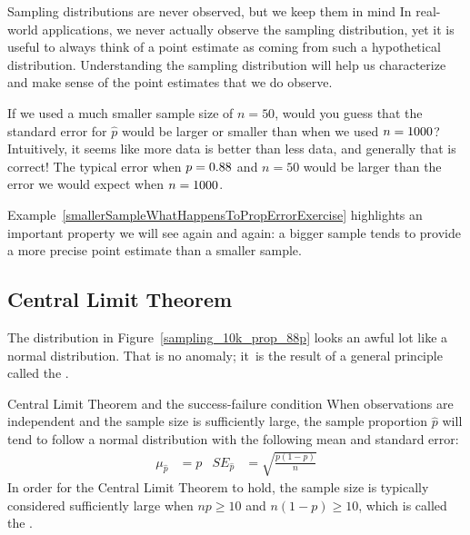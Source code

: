 \begin{onebox}{Sampling distributions are
    never observed, but we keep them in mind}
  In real-world applications, we never actually observe the
  sampling distribution, yet it is useful to always think of
  a point estimate as coming from such a hypothetical
  distribution.
  \mbox{Understanding} the sampling distribution will help us
  characterize and make sense of the point estimates that we
  do observe.
\end{onebox}

\begin{examplewrap}
\begin{nexample}{If we used a much smaller sample size of $n = 50$,
would you guess that the standard error for $\hat{p}$ would be larger
or smaller than when we used $n = 1000{}$?}
\label{smallerSampleWhatHappensToPropErrorExercise}
Intuitively, it seems like more data is better
than less data, and generally that is correct! The typical error
when $p = 0.88{}$ and $n = 50$ would be larger
than the error we would expect when $n = 1000{}$.
\end{nexample}
\end{examplewrap}

Example~\ref{smallerSampleWhatHappensToPropErrorExercise}
highlights an important property we will see again and again:
a bigger sample tends to provide a more precise point estimate
than a smaller sample.



\subsection{Central Limit Theorem}

The distribution in
Figure~\ref{sampling_10k_prop_88p} looks an awful lot like
a normal distribution. That is no anomaly; it~is the result
of a general principle called the
.

\begin{onebox}{Central Limit Theorem and the success-failure condition}
  When observations are independent and the sample size is
  sufficiently large, the sample proportion $\hat{p}$ will tend
  to follow a normal distribution with the following mean and
  standard error:\footnotemark{}
  \begin{align*}
    \mu_{\hat{p}} &= p
    &SE_{\hat{p}} &= \sqrt{\frac{p (1 - p)}{n}}
  \end{align*}
  In order for the Central Limit Theorem to hold,
  the sample size is typically considered sufficiently large
  when $np \geq 10$ and $n(1-p) \geq 10$, which is called the
  .
\end{onebox}

